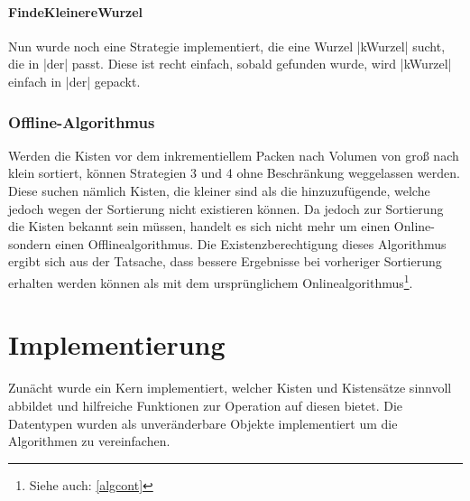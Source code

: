 \paragraph{FindeKleinereWurzel}
 Nun wurde noch eine Strategie implementiert, die eine Wurzel |kWurzel| sucht, die in |der| passt.
 Diese ist recht einfach, sobald gefunden wurde, wird |kWurzel| einfach in |der| gepackt.
\subsubsection{Offline-Algorithmus}
 Werden die Kisten vor dem inkrementiellem Packen nach Volumen von groß nach klein sortiert, können Strategien 3 und 4 ohne Beschränkung weggelassen werden.
 Diese suchen nämlich Kisten, die kleiner sind als die hinzuzufügende, welche jedoch wegen der Sortierung nicht existieren können.
 Da jedoch zur Sortierung die Kisten bekannt sein müssen, handelt es sich nicht mehr um einen Online- sondern einen Offlinealgorithmus.
 Die Existenzberechtigung dieses Algorithmus ergibt sich aus der Tatsache, dass bessere Ergebnisse bei vorheriger Sortierung erhalten werden können
 als mit dem ursprünglichem Onlinealgorithmus\footnote{Siehe auch: \ref{algcont}}.
\clearpage
\section{Implementierung}
\lstset{basicstyle=\ttfamily}
 Zunächt wurde ein Kern implementiert, welcher Kisten und Kistensätze sinnvoll abbildet und hilfreiche Funktionen zur Operation auf diesen bietet.
 Die Datentypen wurden als unveränderbare Objekte implementiert um die Algorithmen zu vereinfachen.

